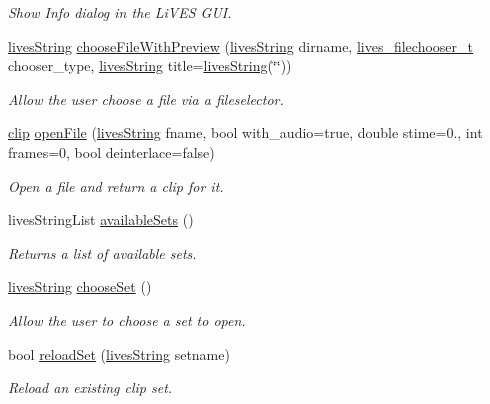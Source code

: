 \begin{DoxyCompactItemize}
\begin{DoxyCompactList}\small\item\em Show Info dialog in the Li\-V\-E\-S G\-U\-I. \end{DoxyCompactList}\item 
\hyperlink{classlives_1_1livesString}{lives\-String} \hyperlink{classlives_1_1livesApp_af74e90b401bfd9543d6a4369db748b32}{choose\-File\-With\-Preview} (\hyperlink{classlives_1_1livesString}{lives\-String} dirname, \hyperlink{liblives_8hpp_a12c81bbcff6fecc0791e83b19f024a9a}{lives\-\_\-filechooser\-\_\-t} chooser\-\_\-type, \hyperlink{classlives_1_1livesString}{lives\-String} title=\hyperlink{classlives_1_1livesString}{lives\-String}(\char`\"{}\char`\"{}))
\begin{DoxyCompactList}\small\item\em Allow the user choose a file via a fileselector. \end{DoxyCompactList}\item 
\hyperlink{classlives_1_1clip}{clip} \hyperlink{classlives_1_1livesApp_ae4edac76c513657c223e6b29a18a2c51}{open\-File} (\hyperlink{classlives_1_1livesString}{lives\-String} fname, bool with\-\_\-audio=true, double stime=0., int frames=0, bool deinterlace=false)
\begin{DoxyCompactList}\small\item\em Open a file and return a clip for it. \end{DoxyCompactList}\item 
lives\-String\-List \hyperlink{classlives_1_1livesApp_a8d648285af74886c0f1bcde01f4a63d1}{available\-Sets} ()
\begin{DoxyCompactList}\small\item\em Returns a list of available sets. \end{DoxyCompactList}\item 
\hyperlink{classlives_1_1livesString}{lives\-String} \hyperlink{classlives_1_1livesApp_a9f95a4fefc631b57c21c56d456e65b3a}{choose\-Set} ()
\begin{DoxyCompactList}\small\item\em Allow the user to choose a set to open. \end{DoxyCompactList}\item 
bool \hyperlink{classlives_1_1livesApp_a0b1d31ae8c5d4490ac74b2f36447a79c}{reload\-Set} (\hyperlink{classlives_1_1livesString}{lives\-String} setname)
\begin{DoxyCompactList}\small\item\em Reload an existing clip set. \end{DoxyCompactList}\item 

\end{DoxyCompactItemize}
